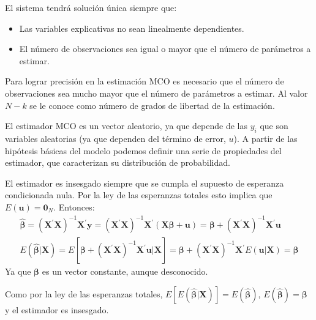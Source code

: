 El sistema tendr\'a soluci\'on \'unica siempre que:
\begin{itemize}
\item Las variables explicativas no sean linealmente dependientes.
\item El n\'umero de observaciones sea igual o mayor que el n\'umero de par\'ametros
a estimar.
\end{itemize}
Para lograr precisi\'on en la estimaci\'on MCO es necesario que el n\'umero
de observaciones sea mucho mayor que el n\'umero de par\'ametros a estimar.
Al valor $N-k$ se le conoce como n\'umero de grados de libertad de
la estimaci\'on.



El estimador MCO es un vector aleatorio, ya que depende de las $y_{i}$ que son variables aleatorias (ya que dependen del t\'ermino de error, $u$). A partir de las hip\'otesis b\'asicas del modelo podemos definir una serie de propiedades del estimador, que caracterizan su distribuci\'on de probabilidad.



El estimador es insesgado siempre que se cumpla el supuesto de esperanza condicionada nula. Por la ley de las esperanzas totales esto implica que $E\left(\boldsymbol{u}\right)=\boldsymbol{0}_{N}$.
Entonces: 
\begin{equation*}
\begin{array}{c}
\hat{\boldsymbol{\beta}}=\left(\boldsymbol{X}^{\prime}\boldsymbol{X}\right)^{-1}\boldsymbol{X}^{\prime}\boldsymbol{y}=\left(\boldsymbol{X}^{\prime}\boldsymbol{X}\right)^{-1}\boldsymbol{X}^{\prime}\left(\boldsymbol{X\beta}+\boldsymbol{u}\right)=\boldsymbol{\beta}+\left(\boldsymbol{X}^{\prime}\boldsymbol{X}\right)^{-1}\boldsymbol{X}^{\prime}\boldsymbol{u}\\
E\left(\hat{\boldsymbol{\beta}}|\boldsymbol{X}\right)=E\left[\boldsymbol{\beta}+\left(\boldsymbol{X}^{\prime}\boldsymbol{X}\right)^{-1}\boldsymbol{X}^{\prime}\boldsymbol{u}|\boldsymbol{X}\right]=\boldsymbol{\beta}+\left(\boldsymbol{X}^{\prime}\boldsymbol{X}\right)^{-1}\boldsymbol{X}^{\prime}E\left(\boldsymbol{u}|\boldsymbol{X}\right)=\boldsymbol{\beta}
\end{array}
\end{equation*}
Ya que $\boldsymbol{\beta}$ es un vector constante, aunque desconocido.

Como por la ley de las esperanzas totales, $E[E\left(\hat{\boldsymbol{\beta}}|\boldsymbol{X}\right)]=E\left(\hat{\boldsymbol{\beta}}\right)$, $E(\hat{\boldsymbol{\beta}})=\boldsymbol{\beta}$ y el estimador es insesgado.

